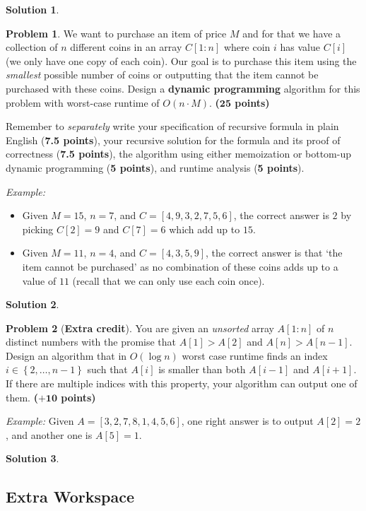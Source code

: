 \documentclass{article}
\theoremstyle{definition}
\newtheorem{problem}{Problem}
\newtheorem*{solution*}{Solution}
\newenvironment{solution}{\begin{solution*}}{{} \end{solution*}}
\newcommand{\grade}[1]{\hfill{\textbf{($\mathbf{#1}$ points)}}}
\newcommand{\set}[1]{\ensuremath{\left\{ #1 \right\}}}
\begin{document}
\smallskip
\begin{solution}
\end{solution}

\newpage

\begin{problem}\label{DP}
We want to purchase an item of price $M$ and for that we have a collection of $n$ different coins in an array $C[1:n]$ where coin $i$ has value $C[i]$ (we only have one copy of each coin).  
	Our goal is to purchase this item using the \emph{smallest} possible number of coins or outputting that the item cannot be purchased with these coins. 
	Design a \textbf{dynamic programming} algorithm for this problem with worst-case runtime of $O(n \cdot M)$. \grade{25}
	
	Remember to \emph{separately} write your specification of recursive formula in plain English (\textbf{7.5 points}), your recursive solution for the formula and its proof of correctness (\textbf{7.5 points}), the algorithm using either memoization 
	or bottom-up dynamic programming (\textbf{5 points}), and runtime analysis (\textbf{5 points}). 
	
	\emph{Example:} 
	\begin{itemize}
		\item Given $M=15$, $n=7$, and $C = [4,9,3,2,7,5,6]$, the correct answer is $2$ by picking $C[2]=9$ and $C[7]=6$ which add up to $15$. 
		\item Given $M=11$, $n=4$, and $C = [4,3,5,9]$, the correct answer is that `the item cannot be purchased' as no combination of these coins adds up to a value of $11$ (recall that we can only use each coin once). 
	\end{itemize}
\end{problem}

\smallskip
\begin{solution}
\end{solution}

\newpage
\begin{problem}[\textbf{Extra credit}]\label{extra}
	You are given an \emph{unsorted} array $A[1:n]$ of $n$ distinct numbers with the promise that $A[1] > A[2]$ and $A[n] > A[n-1]$. 
	Design an algorithm that in $O(\log{n})$ worst case runtime finds an index $i \in \set{2,\ldots,n-1}$ such that $A[i]$ is smaller than both $A[i-1]$ and $A[i+1]$. If there are multiple indices with this property, your algorithm can output one of them. 
	\grade{+10}

\emph{Example:} Given $A=[3,2,7,8,1,4,5,6]$, one right answer is to output $A[2]=2$, and another one is $A[5]=1$. 
\end{problem}

\smallskip
\begin{solution}
\end{solution}

\newpage
\subsection*{Extra Workspace}
\end{document}
